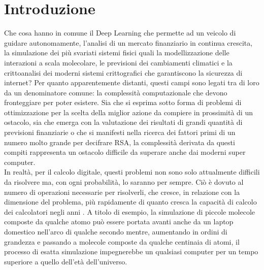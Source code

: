 \documentclass[12pt,a4paper,openright]{report}
\begin{document}
\chapter{Introduzione}
Che cosa hanno in comune il Deep Learning che permette ad un veicolo di guidare autonomamente, l'analisi di un mercato finanziario in continua crescita, la simulazione dei più svariati sistemi fisici 
quali la modellizzazione delle interazioni a scala molecolare, le previsioni dei cambiamenti climatici e la crittoanalisi dei moderni sistemi crittografici che garantiscono la sicurezza di internet?
Per quanto apparentemente distanti, questi campi sono legati tra di loro da un denominatore comune: la complessità computazionale che devono fronteggiare per poter esistere.
Sia che si esprima sotto forma di problemi di ottimizzazione per la scelta della miglior azione da compiere in prossimità di un ostacolo,
sia che emerga con la valutazione dei risultati di grandi quantità di previsioni finanziarie o che si manifesti nella ricerca dei fattori primi di un numero molto grande per decifrare RSA\cite{ref22},
la complessità derivata da questi compiti rappresenta un ostacolo difficile da superare anche dai moderni super computer.\\
In realtà, per il calcolo digitale, questi problemi non sono solo attualmente difficili da risolvere ma, con ogni probabilità, lo saranno per sempre. Ciò è dovuto al numero di operazioni necessarie per risolverli,
che cresce, in relazione con la dimensione del problema, più rapidamente di quanto cresca la capacità di calcolo dei calcolatori negli anni \cite{ref23}.
A titolo di esempio, la simulazione di piccole molecole composte da qualche atomo può essere portata avanti anche da un laptop domestico nell'arco di qualche secondo mentre, aumentando in ordini di grandezza e 
passando a molecole composte da qualche centinaia di atomi, il processo di esatta simulazione impegnerebbe un qualsiasi computer per un tempo superiore a quello dell'età dell'universo.
\end{document}
